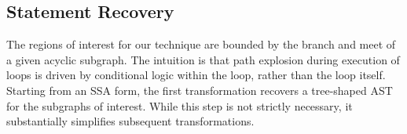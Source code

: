 \subsection{Statement Recovery}
\label{sec:static-analysis}
%

The regions of interest for our technique are bounded by the branch and meet of a given acyclic subgraph.  The intuition is that path explosion during execution of loops is driven by conditional logic within the loop, rather than the loop itself.
Starting from an SSA form, the first transformation recovers a tree-shaped AST for the subgraphs of interest.  While this step is not strictly necessary, it substantially simplifies subsequent transformations.  

